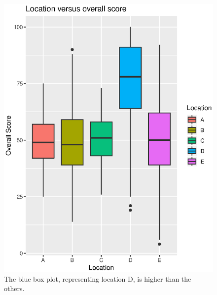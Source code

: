 \documentclass[runningheads]{llncs}
\begin{document}
\begin{figure}[h!]
\begin{multicols}{2}
    \includegraphics[width=\linewidth]{overLoc.eps} \vspace{-0.7cm} \caption{The blue box plot, representing location D, is higher than the others.} \label{overLoc} \par
    

\end{multicols}
\end{figure}
\end{document}
